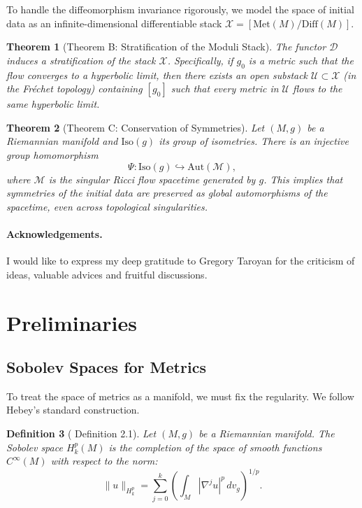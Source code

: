\documentclass[11pt]{article}
\newtheorem{theorem}{Theorem}[section]
\newtheorem{definition}[theorem]{Definition}
\newcommand{\Met}{\mathrm{Met}}
\newcommand{\Diff}{\mathrm{Diff}}
\begin{document}
To handle the diffeomorphism invariance rigorously, we model the space of initial data as an infinite-dimensional differentiable stack $\mathcal{X} = [\Met(M) / \Diff(M)]$.

\begin{theorem}[Theorem B: Stratification of the Moduli Stack]
The functor $\mathcal{D}$ induces a stratification of the stack $\mathcal{X}$. Specifically, if $g_0$ is a metric such that the flow converges to a hyperbolic limit, then there exists an open substack $\mathcal{U} \subset \mathcal{X}$ (in the Fr\'echet topology) containing $[g_0]$ such that every metric in $\mathcal{U}$ flows to the same hyperbolic limit.
\end{theorem}

\begin{theorem}[Theorem C: Conservation of Symmetries]
Let $(M, g)$ be a Riemannian manifold and $\mathrm{Iso}(g)$ its group of isometries. There is an injective group homomorphism
\[ \Psi: \mathrm{Iso}(g) \hookrightarrow \mathrm{Aut}(\mathcal{M}), \]
where $\mathcal{M}$ is the singular Ricci flow spacetime generated by $g$. This implies that symmetries of the initial data are preserved as global automorphisms of the spacetime, even across topological singularities.
\end{theorem}


\paragraph{Acknowledgements.} I would like to express my deep gratitude to Gregory Taroyan for the criticism of ideas, valuable advices and fruitful discussions.



\section{Preliminaries}

\subsection*{Sobolev Spaces for Metrics}
To treat the space of metrics as a manifold, we must fix the regularity. We follow Hebey's standard construction.

\begin{definition}[\cite{Heb96} Definition 2.1]
Let $(M, g)$ be a Riemannian manifold. The Sobolev space $H^p_k(M)$ is the completion of the space of smooth functions $C^\infty(M)$ with respect to the norm:
\[ \|u\|_{H^p_k} = \sum_{j=0}^k \left(\int_M |\nabla^j u|^p \, dv_g \right)^{1/p}. \]
\end{definition}
\end{document}
